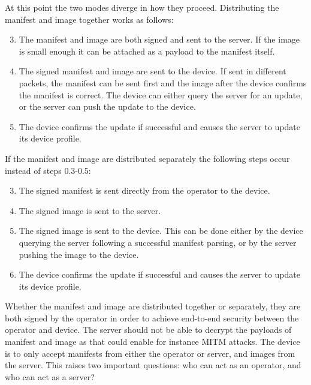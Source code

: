 \documentclass[0-thesis.tex]{subfiles}
\begin{document}
At this point the two modes diverge in how they proceed. Distributing the manifest and
image together works as follows:

\begin{enumerate}[label=0.\arabic*]
    \setcounter{enumi}{2}
    \item The manifest and image are both signed and sent to the server. If the image
            is small enough it can be attached as a payload to the manifest itself.
    \item The signed manifest and image are sent to the device. If sent in different
            packets, the manifest can be sent first and the image after the device confirms the
            manifest is correct. The device can either query the server for an update, or
            the server can push the update to the device.
    \item The device confirms the update if successful and causes the server to update
            its device profile.
\end{enumerate}

If the manifest and image are distributed separately the following steps occur instead of
steps 0.3-0.5:

\begin{enumerate}[label=1.\arabic*]
    \setcounter{enumi}{2}
    \item The signed manifest is sent directly from the operator to the device.
    \item The signed image is sent to the server.
    \item The signed image is sent to the device. This can be done either by the
        device querying the server following a successful manifest parsing, or by the server
        pushing the image to the device.
    \item The device confirms the update if successful and causes the server to update
    its device profile.
\end{enumerate}

Whether the manifest and image are distributed together or separately, they are both
signed by the operator in order to achieve end-to-end security between the operator and
device. The server should not be able to decrypt the payloads of manifest and image as
that could enable for instance MITM attacks. The device is to only accept manifests from
either the operator or server, and images from the server. This raises two important
questions: who can act as an operator, and who can act as a server?
\end{document}
